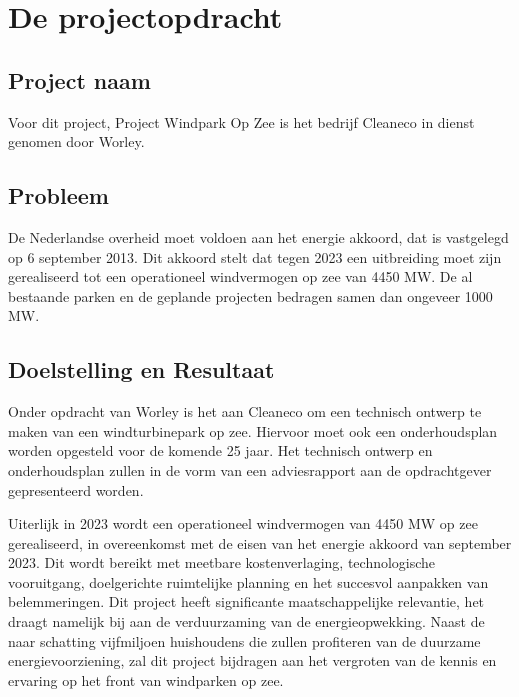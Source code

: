 \section{De projectopdracht}
\subsection{Project naam}
Voor dit project, Project Windpark Op Zee is het bedrijf Cleaneco in dienst genomen door Worley. 

\subsection{Probleem}
De Nederlandse overheid moet voldoen aan het \gls{energie akkoord}\cite{energieakkoord}, dat is vastgelegd op 6 september 2013. Dit akkoord stelt dat tegen 2023 een uitbreiding moet zijn gerealiseerd tot een operationeel windvermogen op zee van 4450 MW. De al bestaande parken en de geplande projecten bedragen samen dan ongeveer 1000 MW.


\subsection{Doelstelling en Resultaat}
Onder opdracht van Worley is het aan Cleaneco om een technisch ontwerp te maken van een windturbinepark op zee. Hiervoor moet ook een onderhoudsplan worden opgesteld voor de komende 25 jaar. Het technisch ontwerp en onderhoudsplan zullen in de vorm van een adviesrapport aan de opdrachtgever gepresenteerd worden.

Uiterlijk in 2023 wordt een operationeel windvermogen van 4450 MW op zee gerealiseerd, in overeenkomst met de eisen van het \gls{energie akkoord}\cite{energieakkoord} van september 2023. Dit wordt bereikt met meetbare kostenverlaging, technologische vooruitgang, doelgerichte ruimtelijke planning en het succesvol aanpakken van belemmeringen. Dit project heeft significante maatschappelijke relevantie, het draagt namelijk bij aan de verduurzaming van de energieopwekking. Naast de naar schatting vijfmiljoen\cite{energieakkoord} huishoudens die zullen profiteren van de duurzame energievoorziening, zal dit project bijdragen aan het vergroten van de kennis en ervaring op het front van windparken op zee.  

